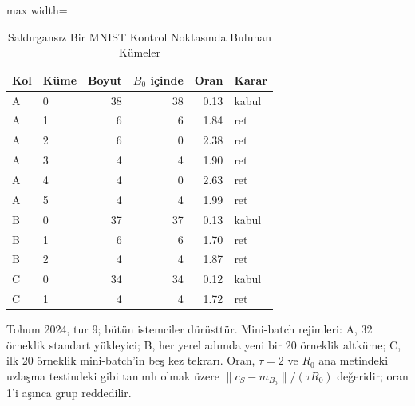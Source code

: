 \begin{table}[!t]
\centering\footnotesize
\setlength{\tabcolsep}{4pt}
\caption{Saldırgansız Bir MNIST Kontrol Noktasında Bulunan Kümeler}\label{tab:cluster_ratios}
\begin{adjustbox}{max width=\columnwidth}
\begin{tabular}{llrrrl}
\toprule
Kol & Küme & Boyut & $B_0$ içinde & Oran & Karar \\
\midrule
A & 0 & 38 & 38 & 0.13 & kabul \\
A & 1 & 6 & 6 & 1.84 & ret \\
A & 2 & 6 & 0 & 2.38 & ret \\
A & 3 & 4 & 4 & 1.90 & ret \\
A & 4 & 4 & 0 & 2.63 & ret \\
A & 5 & 4 & 4 & 1.99 & ret \\
B & 0 & 37 & 37 & 0.13 & kabul \\
B & 1 & 6 & 6 & 1.70 & ret \\
B & 2 & 4 & 4 & 1.87 & ret \\
C & 0 & 34 & 34 & 0.12 & kabul \\
C & 1 & 4 & 4 & 1.72 & ret \\
\bottomrule
\end{tabular}
\end{adjustbox}

\par\vspace{3pt}\parbox{\linewidth}{\footnotesize Tohum 2024, tur 9; bütün istemciler dürüsttür. Mini-batch rejimleri: A, 32 örneklik standart yükleyici; B, her yerel adımda yeni bir 20 örneklik altküme; C, ilk 20 örneklik mini-batch'in beş kez tekrarı. Oran, $\tau=2$ ve $R_0$ ana metindeki uzlaşma testindeki gibi tanımlı olmak üzere $\lVert c_S-m_{B_0}\rVert/(\tau R_0)$ değeridir; oran 1'i aşınca grup reddedilir.}
\end{table}
